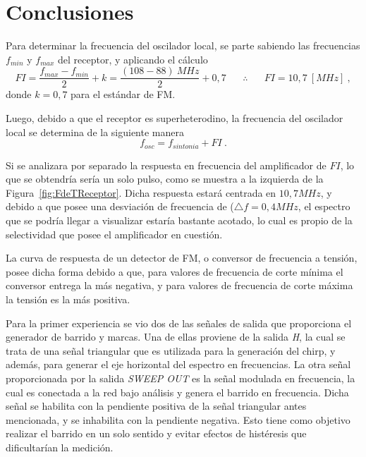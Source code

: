   \section{Conclusiones}

    Para determinar la frecuencia del oscilador local, se parte sabiendo las frecuencias 
    \(f_{min}\) y \(f_{max}\) del receptor, y
    aplicando el cálculo 
      \begin{equation*}
        FI = \dfrac{f_{max} - f_{min}}{2} + k = 
        \dfrac{(108 - 88)~MHz}{2} + 0,7 \hspace{20pt} \therefore \hspace{20pt} FI = 10,7~[MHz]~,
      \end{equation*}
    donde \(k = 0,7\) para el estándar de FM.
    
    Luego, debido a que el receptor es superheterodino, la frecuencia del oscilador local 
    se determina de la siguiente manera
      \begin{equation*}
        f_{osc} = f_{sintonia} +FI~.
      \end{equation*}

    Si se analizara por separado la respuesta en frecuencia del amplificador de \(FI\), lo que
    se obtendría sería un solo pulso, como se muestra a la izquierda de la Figura~\ref{fig:FdeTReceptor}.
    Dicha respuesta estará centrada en \(10,7 MHz\), y debido a que 
    posee una desviación de frecuencia de (\(\triangle f = 0,4 MHz\), el espectro que
    se podría llegar a visualizar estaría bastante acotado, lo cual es propio de la 
    selectividad que posee el amplificador en cuestión.   
    
    La curva de respuesta de un detector de FM, o conversor de frecuencia a tensión, 
    posee dicha forma debido a que, para valores de frecuencia de corte mínima el 
    conversor entrega la más negativa, y para valores  de frecuencia de 
    corte máxima la tensión es la más positiva.   
    
    Para la primer experiencia se vio dos de las señales de salida que proporciona el generador de barrido
    y marcas. Una de ellas proviene de la salida \textit{H}, la cual se trata de una señal triangular que es
    utilizada para la generación del chirp, y además, para generar el eje horizontal del espectro en frecuencias.
    La otra señal proporcionada por la salida  \textit{SWEEP OUT} es la señal modulada en frecuencia, la cual es conectada
    a la red bajo análisis y genera el barrido en frecuencia. Dicha señal se habilita con la pendiente positiva
    de la señal triangular antes mencionada, y se inhabilita con la pendiente negativa. Esto tiene como objetivo
    realizar el barrido en un solo sentido y evitar efectos de histéresis que dificultarían la medición.

